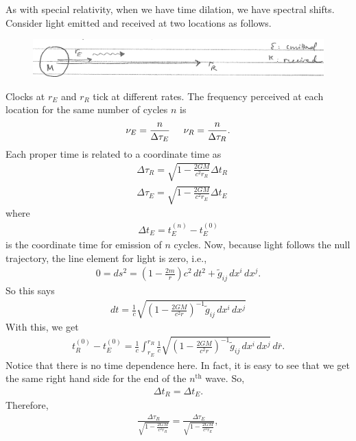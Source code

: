\documentclass{book}
\theoremstyle{definition}
\newcommand{\f}[2]{\frac{#1}{#2}}
\newcommand{\lp}{\left(}
\newcommand{\rp}{\right)}
\begin{document}
As with special relativity, when we have time dilation, we have spectral shifts. Consider light emitted and received at two locations as follows.
\begin{figure}[!htb]
	\centering
	\includegraphics[scale=0.25]{reds}
\end{figure}
Clocks at $r_E$ and $r_R$ tick at different rates. The frequency perceived at each location for the same number of cycles $n$ is
\begin{align*}
\nu_E = \f{n}{\Delta \tau_E} \hspace{0.5cm} \nu_R = \f{n}{\Delta \tau_R}.
\end{align*}
Each proper time is related to a coordinate time as
\begin{align*}
& \Delta \tau_R = \sqrt{1 - \f{2GM}{c^2 r_R}}\Delta t_R\\
& \Delta \tau_E = \sqrt{1 - \f{2GM}{c^2 r_E}}\Delta t_E
\end{align*}
where 
\begin{align*}
\Delta t_E = t_E^{(n)} - t_E^{(0)}
\end{align*}
is the coordinate time for emission of $n$ cycles. Now, because light follows the null trajectory, the line element for light is zero, i.e.,
\begin{align*}
0 = ds^2 = \lp 1 - \f{2m}{r} \rp c^2\,dt^2 + \tilde{g}_{ij}\,dx^i\,dx^j.
\end{align*}
So this says
\begin{align*}
dt = \f{1}{c}\sqrt{\lp 1 - \f{2GM}{c^2 r} \rp^{-1}\tilde{g}_{ij}\,dx^i\,dx^j}
\end{align*}
With this, we get
\begin{align*}
t_R^{(0)} - t_E^{(0)} = \f{1}{c}\int_{r_E}^{r_R} \f{1}{c}\sqrt{\lp 1 - \f{2GM}{c^2 r} \rp^{-1}\tilde{g}_{ij}\,dx^i\,dx^j}\,d\bar{r}.
\end{align*}
Notice that there is no time dependence here. In fact, it is easy to see that we get the same right hand side for the end of the $n^{\text{th}}$ wave. So,
\begin{align*}
\Delta t_R = \Delta t_E.
\end{align*}
Therefore,
\begin{align*}
\f{\Delta \tau_R}{\sqrt{1 - \f{2GM}{c^2 r_R}}}= \f{\Delta \tau_E}{\sqrt{1 - \f{2GM}{c^2 r_E}}},
\end{align*}
\end{document}
